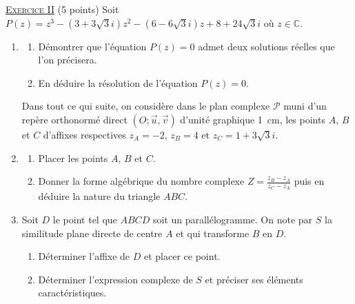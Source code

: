 \noindent \underline{\textsc{Exercice II}} (5 points) \newline
      Soit $P(z) = z^3 - (3+3\sqrt{3}i) z^2 - (6-6\sqrt{3}i)z + 8 + 24\sqrt{3} i$ o\`u $z\in\mathbb{C}$.
      \begin{enumerate}
            \item \begin{enumerate}
                        \item D\'emontrer que l'\'equation $P(z) = 0$ admet deux solutions r\'eelles que l'on pr\'ecisera.
                        \item En d\'eduire la r\'esolution de l'\'equation $P(z) = 0$.
                  \end{enumerate}
            
            Dans tout ce qui suite, on consid\`ere dans le plan complexe $\mathscr{P}$ muni d'un rep\`ere
            orthonorm\'e direct $(O;\vec{u},\vec{v})$ d'unit\'e graphique 1~cm, les points $A$, $B$ et $C$ 
            d'affixes respectives $z_A = -2$, $z_B = 4$ et $z_C = 1 + 3\sqrt{3} i$.
            \item \begin{enumerate}
                        \item Placer les points $A$, $B$ et $C$.
                        \item Donner la forme alg\'ebrique du nombre complexe $Z = \frac{z_B - z_A}{z_C - z_A}$ 
                              puis en d\'eduire la nature du triangle $ABC$.
                  \end{enumerate}
            \item Soit $D$ le point tel que $ABCD$ soit un parall\'elogramme.
                  On note par $S$ la similitude plane directe de centre $A$ et qui transforme $B$ en $D$.
                  \begin{enumerate}
                        \item D\'eterminer l'affixe de $D$ et placer ce point.
                        \item D\'eterminer l'expression complexe de $S$ et pr\'eciser ses \'el\'ements caract\'eristiques.
                  \end{enumerate}
      \end{enumerate}
